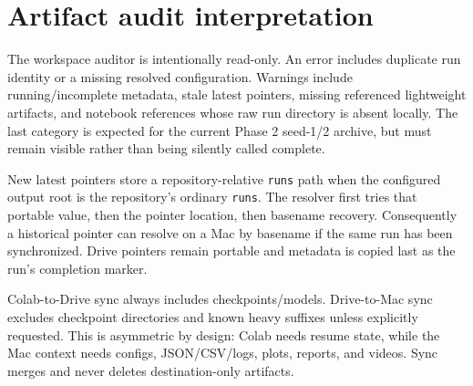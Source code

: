 \documentclass[12pt,twocolumn]{article}
\begin{document}
\section{Artifact audit interpretation}
The workspace auditor is intentionally read-only. An error includes duplicate run identity or a
missing resolved configuration. Warnings include running/incomplete metadata, stale latest
pointers, missing referenced lightweight artifacts, and notebook references whose raw run
directory is absent locally. The last category is expected for the current Phase 2 seed-1/2
archive, but must remain visible rather than being silently called complete.

New latest pointers store a repository-relative \texttt{runs} path when the configured output root is the
repository's ordinary \texttt{runs}. The resolver first tries that portable value, then the pointer
location, then basename recovery. Consequently a historical
 pointer can resolve on a Mac by basename if the same
run has been synchronized. Drive pointers remain portable and metadata is copied last as the run's
completion marker.

Colab-to-Drive sync always includes checkpoints/models. Drive-to-Mac sync excludes checkpoint
directories and known heavy suffixes unless explicitly requested. This is asymmetric by design:
Colab needs resume state, while the Mac context needs configs, JSON/CSV/logs, plots, reports, and
videos. Sync merges and never deletes destination-only artifacts.
\end{document}
